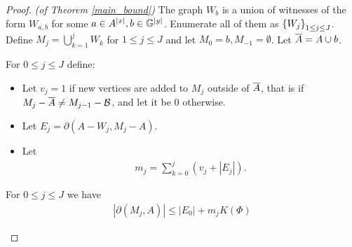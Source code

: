 \documentclass{amsart}
\begin{document}
\begin{proof} \textit{(of Theorem \ref{main_bound})}
  The graph $W_b$ is a union of witnesses of the form $W_{a,b}$ for some $a \in A^{|x|}, b \in \mathbb G^{|y|}$.
  Enumerate all of them as $\left\{W_j\right\}_{1 \leq j \leq J}$.
  Define $M_j = \bigcup_{k=1}^j W_{k}$ for $1 \leq j \leq J$ and let $M_0 = b, M_{-1} = \emptyset$.
  Let $\overline{A} = A \cup b$.
  \begin{Definition}
    For $0 \leq j \leq J$ define:
    \begin{itemize}
    \item Let $v_j = 1$ if new vertices are added to $M_j$ outside of $\overline{A}$, that is if
      $M_j - \overline{A} \neq M_{j-1} - \mathcal B$,
      and let it be $0$ otherwise.
    \item Let %
      $E_j = \partial(A - W_j, M_j - A)$.
    \item Let
      \begin{align*}
        m_j = \sum_{k = 0}^j (v_j + |E_j|).
      \end{align*}
    \end{itemize}
  \end{Definition}

  \begin{Lemma} \label{ubd_lemma}
    For $0 \leq j \leq J$ we have
    \begin{align*}
      |\partial(M_j, A)| \leq |E_0| + m_j K(\Phi) 
    \end{align*}
  \end{Lemma}


\end{proof}
\end{document}
